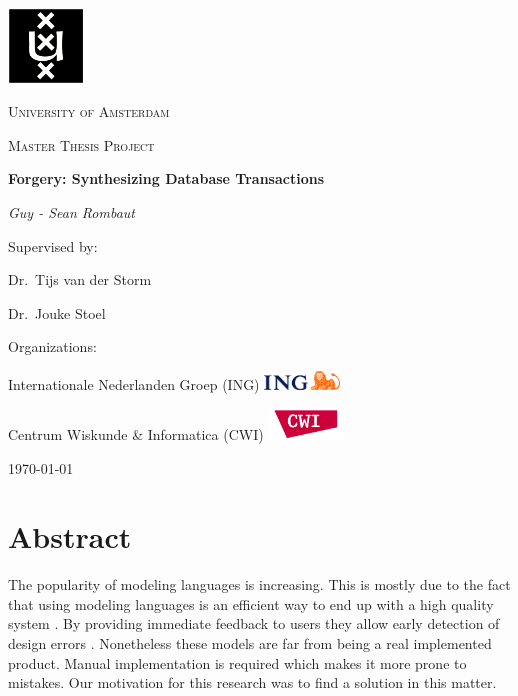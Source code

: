 \documentclass[oneside]{book}
\begin{document}
\begin{titlepage}
	\centering
	\includegraphics[width=0.15\textwidth]{logo-uva}\par\vspace{2.5mm}
	{\scshape\LARGE University of Amsterdam \par}
	\vspace{2mm}
	{\scshape\Large Master Thesis Project\par}
	\vspace{1.5cm}
	{\Huge\bfseries Forgery: Synthesizing Database Transactions\par}
	\vspace{1cm}
	{\Large\itshape Guy - Sean Rombaut\par}
	\vfill
	Supervised by:\par
	Dr.~Tijs van der Storm\par
	Dr.~Jouke Stoel\par
	\vspace{1cm}
	Organizations:\par
		 Internationale Nederlanden Groep (ING) \hfill  \includegraphics[width=0.15\textwidth]{ING}\par
	 Centrum Wiskunde \& Informatica (CWI)  \hfill  \includegraphics[width=0.15\textwidth]{CWIlogo}

	\vfill

	{\large \today\par}
\end{titlepage}

\tableofcontents
\newpage

\chapter{Abstract}
The popularity of modeling languages is increasing. This is mostly due to the fact that using modeling languages is an efficient way to end up with a high quality system \cite[p. ~6]{abstractions}. By providing immediate feedback to users they allow early detection of design errors \cite{lightning}. Nonetheless these models are far from being a real implemented product. Manual implementation is required which makes it more prone to mistakes. Our motivation for this research was to find a solution in this matter.\\
\end{document}
